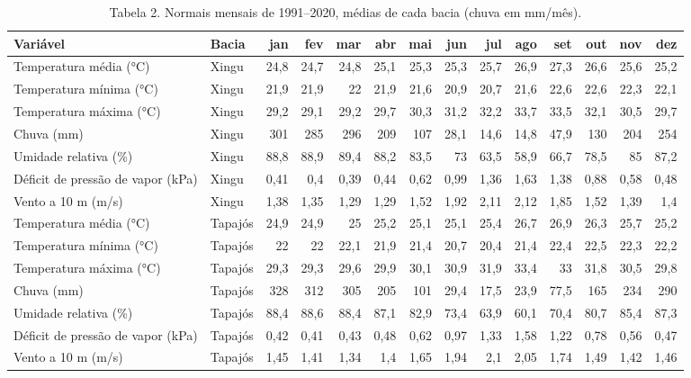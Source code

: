 \begin{table}
\caption{Tabela 2. Normais mensais de 1991–2020, médias de cada bacia (chuva em mm/mês).}
\label{tab:03_clima::normais_mensais}
\begin{tabular}{llrrrrrrrrrrrr}
\toprule
Variável & Bacia & jan & fev & mar & abr & mai & jun & jul & ago & set & out & nov & dez \\
\midrule
Temperatura média (°C) & Xingu & 24,8 & 24,7 & 24,8 & 25,1 & 25,3 & 25,3 & 25,7 & 26,9 & 27,3 & 26,6 & 25,6 & 25,2 \\
Temperatura mínima (°C) & Xingu & 21,9 & 21,9 & 22 & 21,9 & 21,6 & 20,9 & 20,7 & 21,6 & 22,6 & 22,6 & 22,3 & 22,1 \\
Temperatura máxima (°C) & Xingu & 29,2 & 29,1 & 29,2 & 29,7 & 30,3 & 31,2 & 32,2 & 33,7 & 33,5 & 32,1 & 30,5 & 29,7 \\
Chuva (mm) & Xingu & 301 & 285 & 296 & 209 & 107 & 28,1 & 14,6 & 14,8 & 47,9 & 130 & 204 & 254 \\
Umidade relativa (\%) & Xingu & 88,8 & 88,9 & 89,4 & 88,2 & 83,5 & 73 & 63,5 & 58,9 & 66,7 & 78,5 & 85 & 87,2 \\
Déficit de pressão de vapor (kPa) & Xingu & 0,41 & 0,4 & 0,39 & 0,44 & 0,62 & 0,99 & 1,36 & 1,63 & 1,38 & 0,88 & 0,58 & 0,48 \\
Vento a 10 m (m/s) & Xingu & 1,38 & 1,35 & 1,29 & 1,29 & 1,52 & 1,92 & 2,11 & 2,12 & 1,85 & 1,52 & 1,39 & 1,4 \\
Temperatura média (°C) & Tapajós & 24,9 & 24,9 & 25 & 25,2 & 25,1 & 25,1 & 25,4 & 26,7 & 26,9 & 26,3 & 25,7 & 25,2 \\
Temperatura mínima (°C) & Tapajós & 22 & 22 & 22,1 & 21,9 & 21,4 & 20,7 & 20,4 & 21,4 & 22,4 & 22,5 & 22,3 & 22,2 \\
Temperatura máxima (°C) & Tapajós & 29,3 & 29,3 & 29,6 & 29,9 & 30,1 & 30,9 & 31,9 & 33,4 & 33 & 31,8 & 30,5 & 29,8 \\
Chuva (mm) & Tapajós & 328 & 312 & 305 & 205 & 101 & 29,4 & 17,5 & 23,9 & 77,5 & 165 & 234 & 290 \\
Umidade relativa (\%) & Tapajós & 88,4 & 88,6 & 88,4 & 87,1 & 82,9 & 73,4 & 63,9 & 60,1 & 70,4 & 80,7 & 85,4 & 87,3 \\
Déficit de pressão de vapor (kPa) & Tapajós & 0,42 & 0,41 & 0,43 & 0,48 & 0,62 & 0,97 & 1,33 & 1,58 & 1,22 & 0,78 & 0,56 & 0,47 \\
Vento a 10 m (m/s) & Tapajós & 1,45 & 1,41 & 1,34 & 1,4 & 1,65 & 1,94 & 2,1 & 2,05 & 1,74 & 1,49 & 1,42 & 1,46 \\
\bottomrule
\end{tabular}
\end{table}
